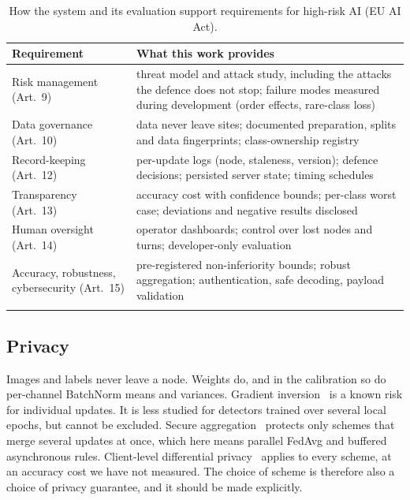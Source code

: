 \documentclass[pdflatex,sn-mathphys-num]{sn-jnl}
\begin{document}
\begin{table}[t]
\caption{How the system and its evaluation support requirements for high-risk AI (EU AI Act).}\label{tab:trust}
\begin{tabular*}{\textwidth}{@{\extracolsep\fill}>{\raggedright\arraybackslash}p{}>{\raggedright\arraybackslash}p{}}
\toprule
Requirement & What this work provides \\
\midrule
Risk management (Art.~9) & threat model and attack study, including the attacks the defence does not stop; failure modes measured during development (order effects, rare-class loss) \\
Data governance (Art.~10) & data never leave sites; documented preparation, splits and data fingerprints; class-ownership registry \\
Record-keeping (Art.~12) & per-update logs (node, staleness, version); defence decisions; persisted server state; timing schedules \\
Transparency (Art.~13) & accuracy cost with confidence bounds; per-class worst case; deviations and negative results disclosed \\
Human oversight (Art.~14) & operator dashboards; control over lost nodes and turns; developer-only evaluation \\
Accuracy, robustness, cybersecurity (Art.~15) & pre-registered non-inferiority bounds; robust aggregation; authentication, safe decoding, payload validation \\
\botrule
\end{tabular*}
\end{table}

\subsection{Privacy}
Images and labels never leave a node. Weights do, and in the calibration so do per-channel BatchNorm means and variances. Gradient inversion~\cite{zhu2019dlg,geiping2020inverting} is a known risk for individual updates. It is less studied for detectors trained over several local epochs, but cannot be excluded. Secure aggregation~\cite{bonawitz2017secagg} protects only schemes that merge several updates at once, which here means parallel FedAvg and buffered asynchronous rules. Client-level differential privacy~\cite{mcmahan2018dp} applies to every scheme, at an accuracy cost we have not measured. The choice of scheme is therefore also a choice of privacy guarantee, and it should be made explicitly.
\end{document}
